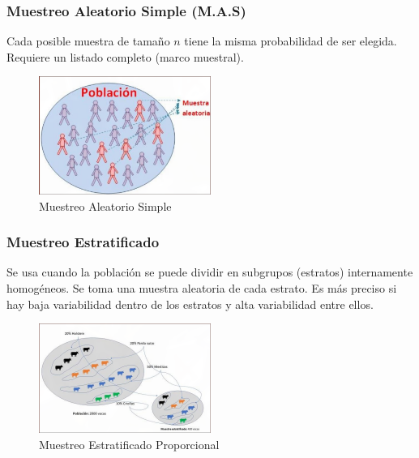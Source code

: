 \documentclass[12pt, letterpaper]{article}
\begin{document}
\subsubsection{Muestreo Aleatorio Simple (M.A.S)}
Cada posible muestra de tamaño $n$ tiene la misma probabilidad de ser elegida. Requiere un listado completo (marco muestral).
\begin{figure}[htbp]
    \centering
    \includegraphics[width=0.5\textwidth]{MAS}
    \caption{Muestreo Aleatorio Simple}
    \label{fig:MAS}
\end{figure}


\subsubsection{Muestreo Estratificado}
Se usa cuando la población se puede dividir en subgrupos (estratos) internamente homogéneos. Se toma una muestra aleatoria de cada estrato. Es más preciso si hay baja variabilidad dentro de los estratos y alta variabilidad entre ellos.
\begin{figure}[htbp]
    \centering
    \includegraphics[width=0.5\textwidth]{MEP}
    \caption{Muestreo Estratificado Proporcional}
    \label{fig:MEP}
\end{figure}
\end{document}
